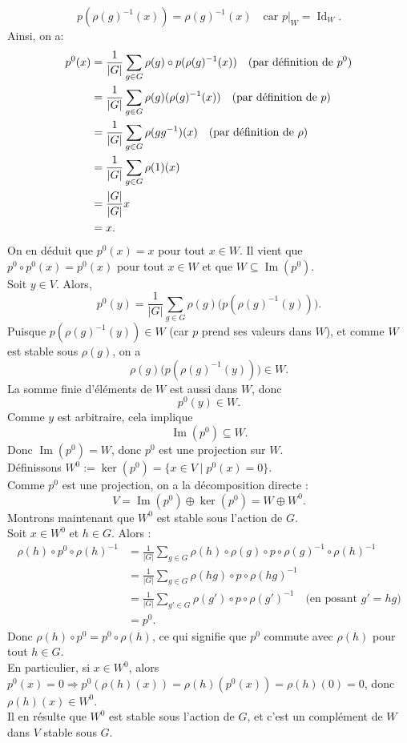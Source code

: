 \documentclass[a4paper, 14pt]{report}
\begin{document}
\begin{onehalfspace}
{\[
p(\rho(g)^{-1}(x)) = \rho(g)^{-1}(x) \quad \text{car } p|_W = \operatorname{Id}_W.
\]
Ainsi, on a:
\[
\begin{aligned}
	p^0(x) &= \frac{1}{|G|} \sum_{g \in G} \rho(g) \circ p(\rho(g)^{-1}(x)) \quad \text{(par définition de \( p^0 \))} \\
	&= \frac{1}{|G|} \sum_{g \in G} \rho(g)(\rho(g)^{-1}(x)) \quad \text{(par définition de \( p \))} \\
	&= \frac{1}{|G|} \sum_{g \in G} \rho(gg^{-1})(x) \quad \text{(par définition de \( \rho \))} \\
	&= \frac{1}{|G|} \sum_{g \in G} \rho(1)(x) \\
	&= \frac{|G|}{|G|} x \\
	&= x.
\end{aligned}
\]
On en déduit que \( p^0(x) = x \) pour tout \( x \in W \). Il vient que \( p^0 \circ p^0(x) = p^0(x) \) pour tout \( x \in W \) et que \(W \subseteq \operatorname{Im}(p^0) \).\\
Soit \( y \in V \). Alors,
\[
p^0(y) = \frac{1}{|G|} \sum_{g \in G} \rho(g) \big( p(\rho(g)^{-1}(y)) \big).
\]
Puisque \( p(\rho(g)^{-1}(y)) \in W \) (car \( p \) prend ses valeurs dans \( W \)),
et comme \( W \) est stable sous \( \rho(g) \), on a
\[
\rho(g) \big( p(\rho(g)^{-1}(y)) \big) \in W.
\]
La somme finie d’éléments de \( W \) est aussi dans \( W \), donc
\[
p^0(y) \in W.
\]
Comme \( y \) est arbitraire, cela implique
\[
\operatorname{Im}(p^0) \subseteq W.
\]
Donc \( \operatorname{Im}(p^0) = W \), donc \( p^0 \) est une projection sur \( W \).\\
Définissons \( W^0 := \ker(p^0) = \{ x \in V \mid p^0(x) = 0 \} \).\\
Comme \( p^0 \) est une projection, on a la décomposition directe :
\[
V = \operatorname{Im}(p^0) \oplus \ker(p^0) = W \oplus W^0.
\]
Montrons maintenant que \( W^0 \) est stable sous l’action de \( G \).\\
Soit \( x \in W^0 \) et \( h \in G \). Alors :
\[
\begin{aligned}
	\rho(h) \circ p^0 \circ \rho(h)^{-1}
	&= \frac{1}{|G|} \sum_{g \in G} \rho(h) \circ \rho(g) \circ p \circ \rho(g)^{-1} \circ \rho(h)^{-1} \\
	&= \frac{1}{|G|} \sum_{g \in G} \rho(hg) \circ p \circ \rho(hg)^{-1} \\
	&= \frac{1}{|G|} \sum_{g' \in G} \rho(g') \circ p \circ \rho(g')^{-1} \quad \text{(en posant } g' = hg) \\
	&= p^0.
\end{aligned}
\]
Donc \( \rho(h) \circ p^0 = p^0 \circ \rho(h) \), ce qui signifie que \( p^0 \) commute avec \( \rho(h) \) pour tout \( h \in G \).\\
En particulier, si \( x \in W^0 \), alors \( p^0(x) = 0 \Rightarrow p^0(\rho(h)(x)) = \rho(h)(p^0(x)) = \rho(h)(0) = 0 \), donc \( \rho(h)(x) \in W^0 \).\\
Il en résulte que \( W^0 \) est stable sous l’action de \( G \), et c’est un complément de \( W \) dans \( V \) stable sous \( G \).


}
\end{onehalfspace}
\end{document}
